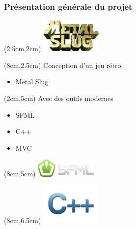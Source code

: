 \begin{frame}
	
	\frametitle{Présentation générale du projet}
	
	\begin{textblock*}{3cm}(2.5cm,2cm)
		\includegraphics[width=3cm]{figures/logo_metal_slug.png}
	\end{textblock*}
	
	\begin{textblock*}{5cm}(8cm,2.5cm)
		Conception d'un jeu rétro
		\vfill
		\begin{itemize}
			\item Metal Slug
		\end{itemize}
	\end{textblock*}
	
	{
		\begin{textblock*}{5cm}(2cm,5cm)
			Avec des outils modernes
			\vfill
			\begin{itemize}
				\item SFML
			\end{itemize}
			\begin{itemize}
				\item C++
			\end{itemize}
			\begin{itemize}
				\item MVC
			\end{itemize}
		\end{textblock*}
	
		\begin{textblock*}{3cm}(8cm,5cm)
			\includegraphics[width=3cm]{figures/logo_sfml.png}
		\end{textblock*}
	
		\begin{textblock*}{3cm}(8cm,6.5cm)
			\includegraphics[width=3cm]{figures/logo_c++.png}
		\end{textblock*}
	}
	
\end{frame}
